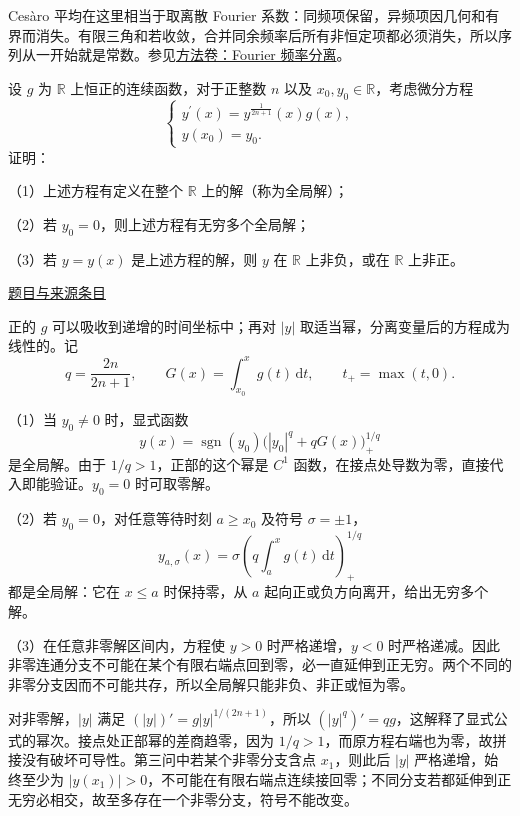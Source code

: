 \documentclass[UTF8,12pt,a4paper,fontset=fandol]{ctexart}
\begin{document}
\begin{remark}[方法与条件]Cesàro 平均在这里相当于取离散 Fourier 系数：同频项保留，异频项因几何和有界而消失。有限三角和若收敛，合并同余频率后所有非恒定项都必须消失，所以序列从一开始就是常数。参见\hyperref[app:integration-fourier]{方法卷：Fourier 频率分离}。\end{remark}

\begin{example}\label{ex:fin12-low:9}\label{pr:fin12-low:9}

设 $g$ 为 $\mathbb{R}$ 上恒正的连续函数，对于正整数 $n$ 以及 $x_{0}, y_{0} \in \mathbb{R}$，考虑微分方程
\[
\begin{cases} y^{\prime}(x) = y^{\frac{1}{2n+1}}(x) g(x), \\ y\left(x_{0}\right) = y_{0}. \end{cases}
\]
证明：

（1）上述方程有定义在整个 $\mathbb{R}$ 上的解（称为全局解）；

（2）若 $y_{0} = 0$，则上述方程有无穷多个全局解；

（3）若 $y = y(x)$ 是上述方程的解，则 $y$ 在 $\mathbb{R}$ 上非负，或在 $\mathbb{R}$ 上非正。

\par\href{https://github.com/lzxcr/cmc-mathematics/blob/64916fa1fdbc3e444a652eca204d5669058ee321/src/problems/finals/12/10.md}{题目与来源条目}

\end{example}

\begin{solve}\label{ans:fin12-low:9}

正的 $g$ 可以吸收到递增的时间坐标中；再对 $|y|$ 取适当幂，分离变量后的方程成为线性的。记
\[
q=\frac{2n}{2n+1},\qquad G(x)=\int_{x_0}^xg(t)\,\mathrm dt,\qquad t_+=\max(t,0).
\]

（1）当 $y_0\ne0$ 时，显式函数
\[
y(x)=\operatorname{sgn}(y_0)\bigl(|y_0|^q+qG(x)\bigr)_+^{1/q}
\]
是全局解。由于 $1/q>1$，正部的这个幂是 $C^1$ 函数，在接点处导数为零，直接代入即能验证。$y_0=0$ 时可取零解。

（2）若 $y_0=0$，对任意等待时刻 $a\geq x_0$ 及符号 $\sigma=\pm1$，
\[
y_{a,\sigma}(x)=\sigma\left(q\int_a^xg(t)\,\mathrm dt\right)_+^{1/q}
\]
都是全局解：它在 $x\leq a$ 时保持零，从 $a$ 起向正或负方向离开，给出无穷多个解。

（3）在任意非零解区间内，方程使 $y>0$ 时严格递增，$y<0$ 时严格递减。因此非零连通分支不可能在某个有限右端点回到零，必一直延伸到正无穷。两个不同的非零分支因而不可能共存，所以全局解只能非负、非正或恒为零。

对非零解，$|y|$ 满足 $(|y|)'=g|y|^{1/(2n+1)}$，所以 $(|y|^q)'=qg$，这解释了显式公式的幂次。接点处正部幂的差商趋零，因为 $1/q>1$，而原方程右端也为零，故拼接没有破坏可导性。第三问中若某个非零分支含点 $x_1$，则此后 $|y|$ 严格递增，始终至少为 $|y(x_1)|>0$，不可能在有限右端点连续接回零；不同分支若都延伸到正无穷必相交，故至多存在一个非零分支，符号不能改变。

\end{solve}
\end{document}
